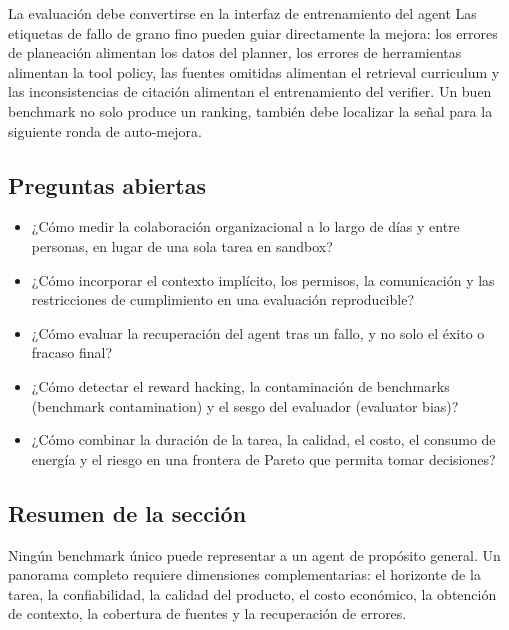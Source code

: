 \begin{importantbox}{La evaluación debe convertirse en la interfaz de entrenamiento del agent}
Las etiquetas de fallo de grano fino pueden guiar directamente la mejora: los errores de planeación alimentan los datos del planner, los errores de herramientas alimentan la tool policy, las fuentes omitidas alimentan el retrieval curriculum y las inconsistencias de citación alimentan el entrenamiento del verifier. Un buen benchmark no solo produce un ranking, también debe localizar la señal para la siguiente ronda de auto-mejora.
\end{importantbox}

\subsection{Preguntas abiertas}

\begin{itemize}
    \item ¿Cómo medir la colaboración organizacional a lo largo de días y entre personas, en lugar de una sola tarea en sandbox?
    \item ¿Cómo incorporar el contexto implícito, los permisos, la comunicación y las restricciones de cumplimiento en una evaluación reproducible?
    \item ¿Cómo evaluar la recuperación del agent tras un fallo, y no solo el éxito o fracaso final?
    \item ¿Cómo detectar el reward hacking, la contaminación de benchmarks (benchmark contamination) y el sesgo del evaluador (evaluator bias)?
    \item ¿Cómo combinar la duración de la tarea, la calidad, el costo, el consumo de energía y el riesgo en una frontera de Pareto que permita tomar decisiones?
\end{itemize}

\subsection{Resumen de la sección}

Ningún benchmark único puede representar a un agent de propósito general. Un panorama completo requiere dimensiones complementarias: el horizonte de la tarea, la confiabilidad, la calidad del producto, el costo económico, la obtención de contexto, la cobertura de fuentes y la recuperación de errores.

